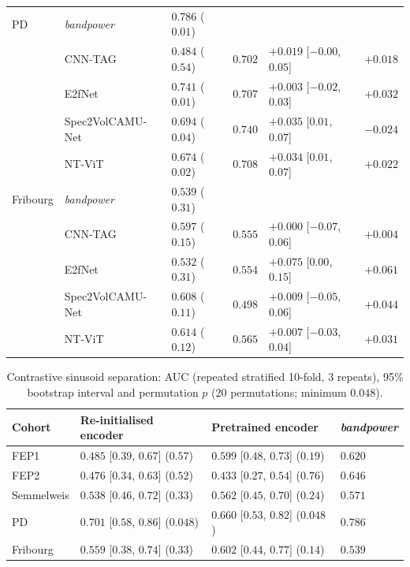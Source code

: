 \documentclass{article}
\begin{document}
\begin{table}[t]
\begin{tabular}{ p{1.8cm} | p{3.2cm} | p{1.8cm} | p{1.2cm} | p{3.0cm} | p{1.6cm}}
        \hline
        PD & \textit{bandpower} & $\mathbf{0.786}$ ($0.01$) & & & \\
         & CNN-TAG & $0.484$ ($0.54$) & $0.702$ & $+0.019$ [$-0.00$, $0.05$] & $+0.018$ \\
         & E2fNet & $0.741$ ($0.01$) & $0.707$ & $+0.003$ [$-0.02$, $0.03$] & $+0.032$ \\
         & Spec2VolCAMU-Net & $0.694$ ($0.04$) & $0.740$ & $+0.035$ [$0.01$, $0.07$] & $-0.024$ \\
         & NT-ViT & $0.674$ ($0.02$) & $0.708$ & $+0.034$ [$0.01$, $0.07$] & $+0.022$ \\
        \hline
        Fribourg & \textit{bandpower} & $0.539$ ($0.31$) & & & \\
         & CNN-TAG & $0.597$ ($0.15$) & $0.555$ & $+0.000$ [$-0.07$, $0.06$] & $+0.004$ \\
         & E2fNet & $0.532$ ($0.31$) & $0.554$ & $+0.075$ [$0.00$, $0.15$] & $+0.061$ \\
         & Spec2VolCAMU-Net & $0.608$ ($0.11$) & $0.498$ & $+0.009$ [$-0.05$, $0.06$] & $+0.044$ \\
         & NT-ViT & $0.614$ ($0.12$) & $0.565$ & $+0.007$ [$-0.03$, $0.04$] & $+0.031$ \\
        \hline
        \hline
    \end{tabular}
\end{table}

\begin{table}[t]
    \centering
    \caption{Contrastive sinusoid separation: AUC (repeated stratified 10-fold, 3 repeats), 95\% bootstrap interval and permutation $p$ (20 permutations; minimum $0.048$).}
    \label{tab:contrastive}
    \small
    \begin{tabular}{ p{1.6cm} | p{3.4cm} | p{3.4cm} | p{1.4cm}}
        \hline
        \hline
        \hfil Cohort & \hfil Re-initialised encoder & \hfil Pretrained encoder & \hfil \textit{bandpower} \\
        \hline
        FEP1 & $0.485$ [$0.39$, $0.67$] ($0.57$) & $0.599$ [$0.48$, $0.73$] ($0.19$) & $0.620$ \\
        FEP2 & $0.476$ [$0.34$, $0.63$] ($0.52$) & $0.433$ [$0.27$, $0.54$] ($0.76$) & $0.646$ \\
        Semmelweis & $0.538$ [$0.46$, $0.72$] ($0.33$) & $0.562$ [$0.45$, $0.70$] ($0.24$) & $0.571$ \\
        PD & $0.701$ [$0.58$, $0.86$] ($0.048$) & $0.660$ [$0.53$, $0.82$] ($0.048$) & $0.786$ \\
        Fribourg & $0.559$ [$0.38$, $0.74$] ($0.33$) & $0.602$ [$0.44$, $0.77$] ($0.14$) & $0.539$ \\
        \hline
        \hline
    \end{tabular}
\end{table}
\end{document}
